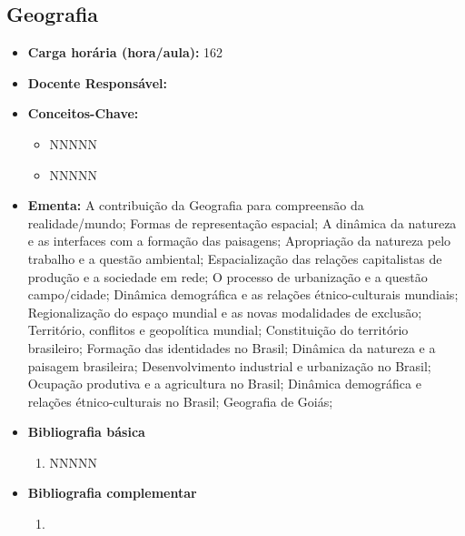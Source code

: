 \documentclass[11pt,fleqn]{book} %
\begin{document}
\subsection{Geografia}\label{disc:geografia}
\begin{itemize}
	\item \textbf{Carga horária (hora/aula):} 162
	\item \textbf{Docente Responsável:}
	\item \textbf{Conceitos-Chave:}
	\begin{itemize}
		\item NNNNN
		\item NNNNN
	\end{itemize}
	\item \textbf{Ementa:} A contribuição da Geografia para compreensão da realidade/mundo;
	Formas de representação espacial;
	A dinâmica da natureza e as interfaces com a formação das paisagens;
	Apropriação da natureza pelo trabalho e a questão ambiental;
	Espacialização das relações capitalistas de produção e a sociedade em rede;
	O processo de urbanização e a questão campo/cidade;
	Dinâmica demográfica e as relações étnico-culturais mundiais;
	Regionalização do espaço mundial e as novas modalidades de exclusão;
	Território, conflitos e geopolítica mundial;
	Constituição do território brasileiro;
	Formação das identidades no Brasil; 
	Dinâmica da natureza e a paisagem brasileira;
	Desenvolvimento industrial e urbanização no Brasil;
	Ocupação produtiva e a agricultura no Brasil; 
	Dinâmica demográfica e relações étnico-culturais no Brasil;
	Geografia de Goiás;
	\item \textbf{Bibliografia básica}
	\begin{enumerate}
		\item NNNNN
	\end{enumerate}
	\item \textbf{Bibliografia complementar}
	\begin{enumerate}
		\item 
	\end{enumerate}	
\end{itemize}



\newpage
\end{document}
